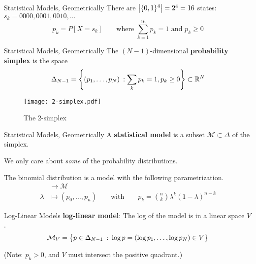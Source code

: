 \documentclass[xcolor=dvipsnames]{beamer}
\newcommand*{\ms}{\mathcal M}
\begin{document}
\begin{frame}{Statistical Models, Geometrically}
    There are $\vdel[\big]{\{0, 1\}^4} = 2^4 = 16$ states: \quad $s_k = 0000, 0001,
    0010, \ldots$
    \[
        p_k = P[X = s_k]
        \qquad
        \text{where $\sum_{k=1}^{16} p_k = 1$ and $p_k \ge 0$}
    \]
\end{frame}
\begin{frame}{Statistical Models, Geometrically}
    \lspace
    \lspace
    The $(N-1)$-dimensional \textbf{probability simplex} is the space
    \[
        \Delta_{N-1} = \cdel*{ (p_1, \ldots, p_N) \:: \sum_k p_k= 1, p_k \ge 0 }
        \subset \R^N
    \]
    \nlspace
    \begin{figure}\centering
        \texttt{[image: 2-simplex.pdf]} 
        \caption{The 2-simplex}
    \end{figure}
\end{frame}

\begin{frame}{Statistical Models, Geometrically}
    A \textbf{statistical model} is a subset $\ms \subset \Delta$ of the
    simplex.

    \lspace
    We only care about \emph{some} of the probability distributions.

    \pause
    \lspace
    \begin{example}
        The binomial distribution is a model with the following parametrization.
        \begin{align*}
            [0, 1] &\to \ms \\
            \lambda &\mapsto (p_0, \ldots, p_n)
            \qquad
            \text{with}
            \qquad
            p_k = \binom n k \lambda^k (1 - \lambda)^{n-k}
        \end{align*}
    \end{example}
\end{frame}

\begin{frame}{Log-Linear Models}
    \textbf{log-linear model}: The log of the model is in a linear space $V$.
    \[
        \ms_V = \cdel[\big]{ p \in \Delta_{N-1}
        \::\: \log p  = (\log p_1, \ldots, \log p_N) \in V}
    \]

    \lspace
    \lspace
    {\footnotesize
    (Note: $p_k > 0$, and $V$ must intersect the positive quadrant.)
    }
\end{frame}
\end{document}
